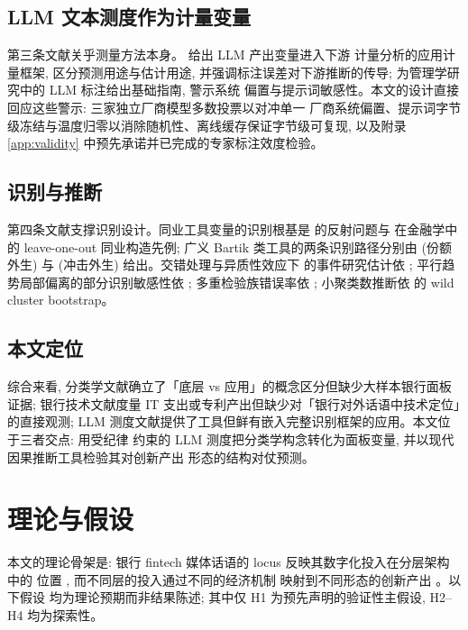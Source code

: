 \subsection{LLM 文本测度作为计量变量}

第三条文献关乎测量方法本身。\textcite{ludwig2025llmecon} 给出 LLM 产出变量进入下游
计量分析的应用计量框架, 区分预测用途与估计用途, 并强调标注误差对下游推断的传导;
\textcite{carlson2026llmannotation} 为管理学研究中的 LLM 标注给出基础指南, 警示系统
偏置与提示词敏感性。本文的设计直接回应这些警示: 三家独立厂商模型多数投票以对冲单一
厂商系统偏置、提示词字节级冻结与温度归零以消除随机性、离线缓存保证字节级可复现,
以及附录 \ref{app:validity} 中预先承诺并已完成的专家标注效度检验。

\subsection{识别与推断}

第四条文献支撑识别设计。同业工具变量的识别根基是 \textcite{manski1993reflection}
的反射问题与 \textcite{leary2014peereffects} 在金融学中的 leave-one-out 同业构造先例;
广义 Bartik 类工具的两条识别路径分别由 \textcite{goldsmithpinkham2020bartik} (份额
外生) 与 \textcite{borusyak2022shiftshare} (冲击外生) 给出。交错处理与异质性效应下
的事件研究估计依 \parencite{sunabraham2021eventstudy,callaway2021difference,
borusyak2024revisiting}; 平行趋势局部偏离的部分识别敏感性依
\textcite{rambachan2023honestdid}; 多重检验族错误率依 \textcite{romanowolf2005stepdown};
小聚类数推断依 \textcite{roodman2019boottest} 的 wild cluster bootstrap。

\subsection{本文定位}

综合来看, 分类学文献确立了「底层 vs 应用」的概念区分但缺少大样本银行面板证据;
银行技术文献度量 IT 支出或专利产出但缺少对「银行对外话语中技术定位」的直接观测;
LLM 测度文献提供了工具但鲜有嵌入完整识别框架的应用。本文位于三者交点: 用受纪律
约束的 LLM 测度把分类学构念转化为面板变量, 并以现代因果推断工具检验其对创新产出
形态的结构对仗预测。

\section{理论与假设}\label{sec:hypo}

本文的理论骨架是: 银行 fintech 媒体话语的 locus 反映其数字化投入在分层架构中的
位置 \parencite{gomber2017cube,yoo2010layered}, 而不同层的投入通过不同的经济机制
映射到不同形态的创新产出 \parencite{boot2021fintech,adner2010ecosystem}。以下假设
均为理论预期而非结果陈述; 其中仅 H1 为预先声明的验证性主假设, H2--H4 均为探索性。

